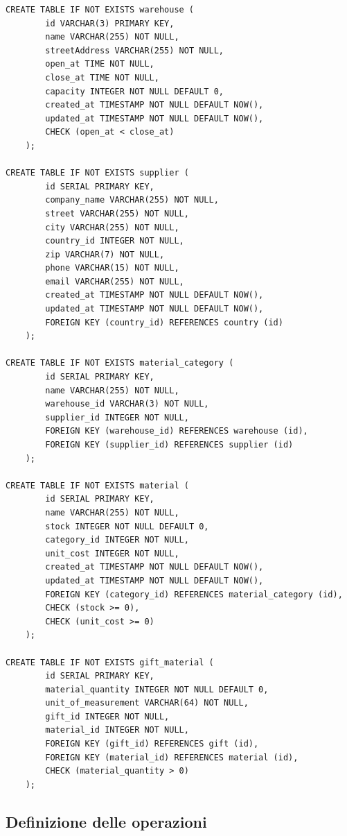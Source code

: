 \documentclass[12pt]{report}
\begin{document}
\begin{lstlisting}
CREATE TABLE IF NOT EXISTS warehouse (
        id VARCHAR(3) PRIMARY KEY,
        name VARCHAR(255) NOT NULL,
        streetAddress VARCHAR(255) NOT NULL,
        open_at TIME NOT NULL,
        close_at TIME NOT NULL,
        capacity INTEGER NOT NULL DEFAULT 0,
        created_at TIMESTAMP NOT NULL DEFAULT NOW(),
        updated_at TIMESTAMP NOT NULL DEFAULT NOW(),
        CHECK (open_at < close_at)
    );

CREATE TABLE IF NOT EXISTS supplier (
        id SERIAL PRIMARY KEY,
        company_name VARCHAR(255) NOT NULL,
        street VARCHAR(255) NOT NULL,
        city VARCHAR(255) NOT NULL,
        country_id INTEGER NOT NULL,
        zip VARCHAR(7) NOT NULL,
        phone VARCHAR(15) NOT NULL,
        email VARCHAR(255) NOT NULL,
        created_at TIMESTAMP NOT NULL DEFAULT NOW(),
        updated_at TIMESTAMP NOT NULL DEFAULT NOW(),
        FOREIGN KEY (country_id) REFERENCES country (id)
    );

CREATE TABLE IF NOT EXISTS material_category (
        id SERIAL PRIMARY KEY,
        name VARCHAR(255) NOT NULL,
        warehouse_id VARCHAR(3) NOT NULL,
        supplier_id INTEGER NOT NULL,
        FOREIGN KEY (warehouse_id) REFERENCES warehouse (id),
        FOREIGN KEY (supplier_id) REFERENCES supplier (id)
    );

CREATE TABLE IF NOT EXISTS material (
        id SERIAL PRIMARY KEY,
        name VARCHAR(255) NOT NULL,
        stock INTEGER NOT NULL DEFAULT 0,
        category_id INTEGER NOT NULL,
        unit_cost INTEGER NOT NULL,
        created_at TIMESTAMP NOT NULL DEFAULT NOW(),
        updated_at TIMESTAMP NOT NULL DEFAULT NOW(),
        FOREIGN KEY (category_id) REFERENCES material_category (id),
        CHECK (stock >= 0),
        CHECK (unit_cost >= 0)
    );

CREATE TABLE IF NOT EXISTS gift_material (
        id SERIAL PRIMARY KEY,
        material_quantity INTEGER NOT NULL DEFAULT 0,
        unit_of_measurement VARCHAR(64) NOT NULL,
        gift_id INTEGER NOT NULL,
        material_id INTEGER NOT NULL,
        FOREIGN KEY (gift_id) REFERENCES gift (id),
        FOREIGN KEY (material_id) REFERENCES material (id),
        CHECK (material_quantity > 0)
    );
\end{lstlisting}

\subsection{Definizione delle operazioni}
\end{document}
